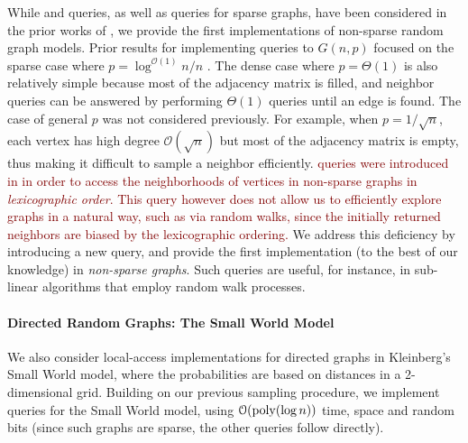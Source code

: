 While  and  queries, as well as  queries for sparse graphs,
have been considered in the prior works of \cite{reut, huge_old, huge, sparse},
we provide the first implementations of non-sparse random graph models.
Prior results for implementing queries to $G(n,p)$ focused on the sparse case where $p = \log^{\mathcal O(1)} n/n$ \cite{sparse}.
The dense case where $p = \Theta(1)$ is also relatively simple because most of the adjacency matrix is filled,
and neighbor queries can be answered by performing $\Theta(1)$  queries until an edge is found.
The case of general $p$ was not considered previously.
For example, when $p = 1/\sqrt{n}$, each vertex has high degree $\mathcal O(\sqrt{n})$ but most of the adjacency matrix is empty,
thus making it difficult to sample a neighbor efficiently.
\textcolor{Maroon}{ queries were introduced in \cite{reut}
in order to access the neighborhoods of vertices in non-sparse graphs in \emph{lexicographic order}.
This query however does not allow us to efficiently explore graphs in a natural way, such as via random walks,
since the initially returned neighbors are biased by the lexicographic ordering.
}
We address this deficiency by introducing a new  query,
and provide the first implementation (to the best of our knowledge) in \emph{non-sparse graphs}.
Such queries are useful, for instance, in sub-linear algorithms that employ random walk processes.


\paragraph*{Directed Random Graphs: The Small World Model}
\label{par:directed_random_graphs}
We also consider local-access implementations for directed graphs in Kleinberg's Small World model,
where the probabilities are based on distances in a 2-dimensional grid.
Building on our previous sampling procedure, we implement  queries for the Small World model,
using $\mathcal{O}(\mathrm{poly}(\log n))$ time, space and random bits (since such graphs are sparse, the other queries follow directly).




